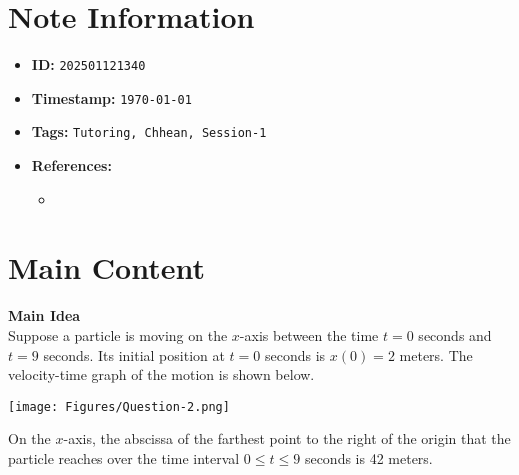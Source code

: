 \clearpage
{}
\label{202501121340}
\renewcommand{\notetitle}{Question 2}

\section*{Note Information}
\begin{itemize}
  \item \textbf{ID:} \texttt{202501121340}
  \item \textbf{Timestamp:} \texttt{\today \ \currenttime}
  \item \textbf{Tags:} \texttt{Tutoring, Chhean, Session-1}
  \item \textbf{References:}
    \begin{itemize}
      \item \href{}{}
    \end{itemize}
\end{itemize}


\section*{Main Content}
\textbf{Main Idea}\\
Suppose a particle is moving on the $x$-axis between the time $t=0$ seconds and $t = 9$ seconds. Its initial position at $t=0$ seconds is $x(0)=2$ meters. 
The velocity-time graph of the motion is shown below.\\
\begin{center}
  \texttt{[image: Figures/Question-2.png]}\\
\end{center}
On the $x$-axis, the abscissa of the farthest point to the right of the origin that the particle reaches over the time interval $0 \leq t \leq 9$ seconds is 42 meters.\\

